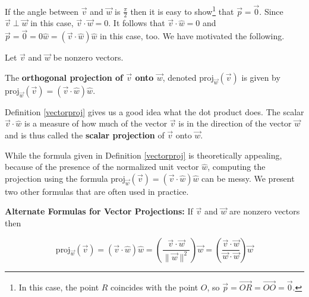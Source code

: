 \documentclass{ximera}
\begin{document}
 


If the angle between $\overrightarrow{v}$ and $\overrightarrow{w}$ is $\frac{\pi}{2}$ then it is easy to show\footnote{In this case, the point $R$ coincides with the point $O$, so $\overrightarrow{p} =  \overrightarrow{OR} =  \overrightarrow{OO} = \overrightarrow{0}$.} that $\overrightarrow{p} = \overrightarrow{0}$. Since $\overrightarrow{v} \perp \overrightarrow{w}$ in this case, $\overrightarrow{v} \cdot \overrightarrow{w} = 0$.   It follows that $\overrightarrow{v} \cdot \hat{w} = 0$ and $\overrightarrow{p} = \overrightarrow{0} = 0 \hat{w} = (\overrightarrow{v} \cdot \hat{w}) \hat{w}$ in this case, too.  We have motivated the following.

 


\begin{definition} \label{vectorproj} Let $\overrightarrow{v}$ and $\overrightarrow{w}$ be nonzero vectors.  

 

The \textbf{orthogonal projection of $\overrightarrow{v}$ onto $\overrightarrow{w}$}, denoted $\text{proj}_{\overrightarrow{w}}(\overrightarrow{v})$ is given by $\text{proj}_{\overrightarrow{w}}(\overrightarrow{v}) = (\overrightarrow{v} \cdot \hat{w}) \hat{w}$.

 

\end{definition}

 

Definition \ref{vectorproj} gives us a good idea what the dot product does.  The scalar $\overrightarrow{v} \cdot \hat{w}$ is a measure of how much of the vector $\overrightarrow{v}$ is in the direction of the vector $\overrightarrow{w}$ and is thus called the \textbf{scalar projection} of $\overrightarrow{v}$ onto $\overrightarrow{w}$.  

 

While the formula given in Definition \ref{vectorproj} is theoretically appealing, because of the presence of the normalized unit vector $\hat{w}$, computing the projection using the formula $\text{proj}_{\overrightarrow{w}}(\overrightarrow{v}) = (\overrightarrow{v} \cdot \hat{w}) \hat{w}$ can be messy.  We present two other formulas that are often used in practice.

 


\begin{theorem} \label{altprojformulas} \textbf{Alternate Formulas for Vector Projections:}  If $\overrightarrow{v}$ and $\overrightarrow{w}$ are nonzero vectors then

\[\text{proj}_{\overrightarrow{w}}(\overrightarrow{v}) = (\overrightarrow{v} \cdot \hat{w}) \hat{w} = \left(\frac{\overrightarrow{v} \cdot \overrightarrow{w}}{\| \overrightarrow{w}\|^2}\right) \overrightarrow{w} = \left(\frac{\overrightarrow{v} \cdot \overrightarrow{w}}{\overrightarrow{w} \cdot \overrightarrow{w}}\right) \overrightarrow{w} \]

\end{theorem}
\end{document}
